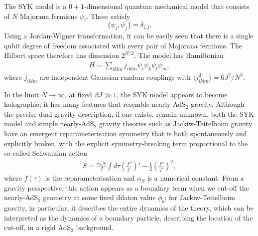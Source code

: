 \documentclass[12pt]{article}
\begin{document}
The SYK model is a $0+1$-dimensional quantum mechanical model that consists of $N$ Majorana fermions $\psi_i$. These satisfy $$\{\psi_i, \psi_j\} = \delta_{i,j}.$$ Using a Jordan-Wigner transformation, it can be easily seen that there is a single qubit degree of freedom associated with every pair of Majorana fermions. The Hilbert space therefore has dimension $2^{N/2}$. The model has Hamiltonian
\begin{align}
H = \sum_{iklm} j_{iklm} \psi_i \psi_k \psi_l \psi_m,
\end{align}
where $j_{iklm}$ are independent Gaussian random couplings with $\langle j_{iklm}^2\rangle = 6 J^2/N^3$. 

In the limit $N \to \infty$, at fixed $\beta J \gg 1$, the SYK model appears to become holographic; it has many features that resemble nearly-AdS$_2$ gravity. Although the precise dual gravity description, if one exists, remain unknown, both the SYK model and simple nearly-AdS$_2$ gravity theories such as Jackiw-Teitelboim gravity \cite{almheiri2015models, engelsoy2016investigation, jensen2016chaos, maldacena2016conformal, saad2019jt} have an emergent reparameterisation symmetry that is both spontaneously and explicitly broken, with the explicit symmetry-breaking term proportional to the so-called Schwarzian action
\begin{align} \label{eq:schwarz}
S = \frac{\alpha_S N}{J} \int d\tau \left(\frac{f''}{f'}\right)' - \frac{1}{2} \left(\frac{f''}{f'}\right)^2,
\end{align}
where $f(\tau)$ is the reparameterisation and $\alpha_S$ is a numerical constant. From a gravity perspective, this action appears as a boundary term when we cut-off the nearly-AdS$_2$ geometry at some fixed dilaton value $\phi_b$; for Jackiw-Teitelboim gravity, in particular, it describes the entire dynamics of the theory, which can be interpreted as the dynamics of a boundary particle, describing the location of the cut-off, in a rigid AdS$_2$ background.
\end{document}
